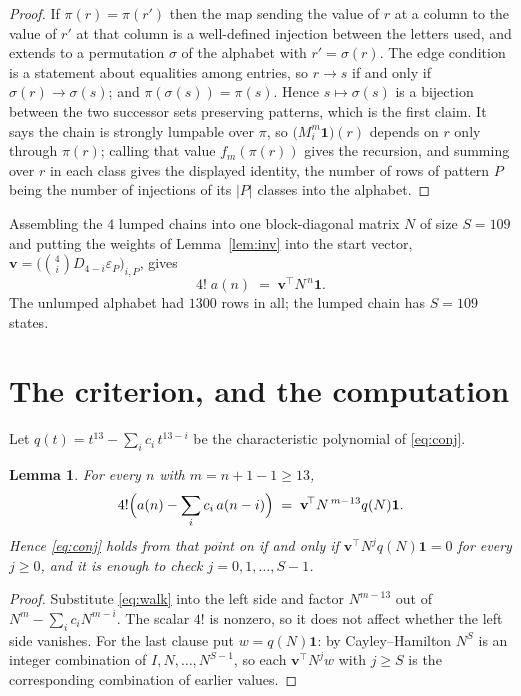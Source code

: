 \documentclass[11pt,a4paper]{article}
\theoremstyle{plain}
\newtheorem{lemma}[theorem]{Lemma}
\theoremstyle{definition}
\begin{document}
\begin{proof}
If $\pi(r)=\pi(r')$ then the map sending the value of $r$ at a column to the value of $r'$
at that column is a well-defined injection between the letters used, and extends to a
permutation $\sigma$ of the alphabet with $r'=\sigma(r)$. The edge condition is a statement
about equalities among entries, so $r\to s$ if and only if $\sigma(r)\to\sigma(s)$; and
$\pi(\sigma(s))=\pi(s)$. Hence $s\mapsto\sigma(s)$ is a bijection between the two successor
sets preserving patterns, which is the first claim. It says the chain is strongly lumpable
over $\pi$, so $\bigl(M_i^{m}\mathbf{1}\bigr)(r)$ depends on $r$ only through $\pi(r)$;
calling that value $f_m(\pi(r))$ gives the recursion, and summing over $r$ in each class
gives the displayed identity, the number of rows of pattern $P$ being the number of
injections of its $|P|$ classes into the alphabet.
\end{proof}

Assembling the $4$ lumped chains into one block-diagonal matrix $N$ of size $S=109$ and
putting the weights of Lemma~\ref{lem:inv} into the start vector,
$\mathbf{v}=\bigl(\binom{4}{i}D_{4-i}\varepsilon_P\bigr)_{i,P}$, gives
\begin{equation}\label{eq:walk}
4!\;a(n)\;=\;\mathbf{v}^{\!\top}N^{\,n}\mathbf{1} .
\end{equation}
The unlumped alphabet had $1300$ rows in all; the lumped chain has $S=109$ states.

\section{The criterion, and the computation}

Let $q(t)=t^{13}-\sum_i c_i\,t^{13-i}$ be the characteristic polynomial of
\eqref{eq:conj}.

\begin{lemma}\label{lem:crit}
For every $n$ with $m=n+1-1\ge13$,
\[
4!\Bigl(a(n)-\sum_i c_i\,a(n-i)\Bigr)\;=\;\mathbf{v}^{\!\top}N^{\,m-13}q(N)\mathbf{1} .
\]
Hence \eqref{eq:conj} holds from that point on if and only if
$\mathbf{v}^{\!\top}N^{j}q(N)\mathbf{1}=0$ for every $j\ge0$, and it is enough to check
$j=0,1,\dots,S-1$.
\end{lemma}

\begin{proof}
Substitute \eqref{eq:walk} into the left side and factor $N^{m-13}$ out of
$N^{m}-\sum_i c_iN^{m-i}$. The scalar $4!$ is nonzero, so it does not affect whether
the left side vanishes. For the last clause put $w=q(N)\mathbf{1}$: by Cayley--Hamilton
$N^{S}$ is an integer combination of $I,N,\dots,N^{S-1}$, so each
$\mathbf{v}^{\!\top}N^{j}w$ with $j\ge S$ is the corresponding combination of earlier
values.
\end{proof}
\end{document}
